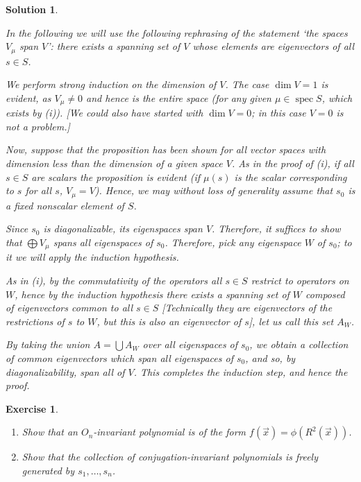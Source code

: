 \documentclass{article}
\newtheorem{ex}{Exercise}
\theoremstyle{nonumberplain}
\newtheorem{sol}{Solution}
\DeclareMathOperator{\spec}{spec}
\begin{document}
\begin{sol}
\begin{enumerate}
In the following we will use the following rephrasing of the statement `the spaces $V_\mu$ span $V$': there exists a spanning set of $V$ whose elements are eigenvectors of all $s \in S$.

We perform strong induction on the dimension of $V$. The case $\dim V = 1$ is evident, as $V_\mu \neq 0$ and hence is the entire space (for any given $\mu \in \spec S$, which exists by (i)). [We could also have started with $\dim V = 0$; in this case $V=0$ is not a problem.]

Now, suppose that the proposition has been shown for all vector spaces with dimension less than the dimension of a given space $V$. As in the proof of (i), if all $s \in S$ are scalars the proposition is evident (if $\mu(s)$ is the scalar corresponding to $s$ for all $s$, $V_\mu = V$). Hence, we may without loss of generality assume that $s_0$ is a fixed nonscalar element of $S$.

Since $s_0$ is diagonalizable, its eigenspaces span $V$. Therefore, it suffices to show that $\bigoplus V_\mu$ spans all eigenspaces of $s_0$. Therefore, pick any eigenspace $W$ of $s_0$; to it we will apply the induction hypothesis.

As in (i), by the commutativity of the operators all $s \in S$ restrict to operators on $W$, hence by the induction hypothesis there exists a spanning set of $W$ composed of eigenvectors common to all $s \in S$ [Technically they are eigenvectors of the restrictions of $s$ to $W$, but this is also an eigenvector of $s$], let us call this set $A_W$.

By taking the union $A = \bigcup A_W$ over all eigenspaces of $s_0$, we obtain a collection of common eigenvectors which span all eigenspaces of $s_0$, and so, by diagonalizability, span all of $V$. This completes the induction step, and hence the proof.
\end{enumerate}
\end{sol}

\begin{ex} \leavevmode
\begin{enumerate}
\item Show that an $O_n$-invariant polynomial is of the form $f(\vec x) = \phi(R^2(\vec x))$.
\item Show that the collection of conjugation-invariant polynomials is freely generated by $s_1, \dots, s_n$.
\end{enumerate}
\end{ex}
\end{document}
